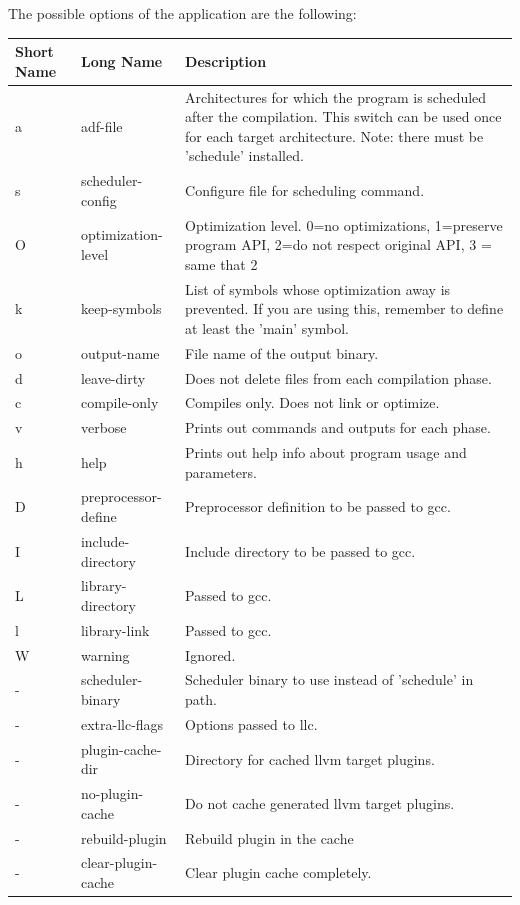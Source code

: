 \documentclass[twoside]{tceusermanual}
\begin{document}
The possible options of the application are the following:\\
\begin{longtable}[htb]{@{}p{}@{}p{}%
                     @{}p{}}
\textbf{Short Name} &\textbf{Long Name} &\textbf{Description} \\
\hline
a & adf-file & Architectures for which the program is scheduled after the 
                        compilation. This switch can be used once for each 
                        target architecture. Note: there must be 'schedule'
                        installed.\\
s & scheduler-config & Configure file for scheduling command. \\
O & optimization-level & Optimization level. 0=no optimizations, 1=preserve
                       program API, 2=do not respect original API, 3 = same
                       that 2 \\
k & keep-symbols & List of symbols whose optimization away is prevented.
                   If you are using this, remember to define at least the
                   'main' symbol. \\
o & output-name & File name of the output binary. \\
d & leave-dirty & Does not delete files from each compilation phase. \\
c & compile-only & Compiles only. Does not link or optimize. \\
v & verbose & Prints out commands and outputs for each phase. \\
h & help & Prints out help info about program usage and parameters.\\
D & preprocessor-define & Preprocessor definition to be passed to gcc. \\
I & include-directory & Include directory to be passed to gcc. \\
L & library-directory & Passed to gcc. \\
l & library-link & Passed to gcc. \\
W & warning & Ignored. \\
- & scheduler-binary & Scheduler binary to use instead of 'schedule' in path. \\
- & extra-llc-flags & Options passed to llc. \\
- & plugin-cache-dir & Directory for cached llvm target plugins. \\
- & no-plugin-cache & Do not cache generated llvm target plugins. \\
- & rebuild-plugin & Rebuild plugin in the cache \\
- & clear-plugin-cache & Clear plugin cache completely. \\
\end{longtable}
\end{document}

